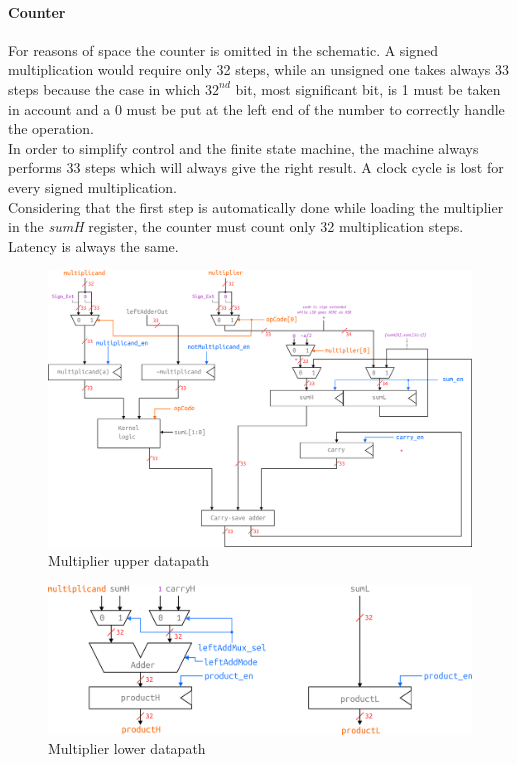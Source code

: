 \paragraph{Counter}
For reasons of space the counter is omitted in the schematic. A signed multiplication would require only 32 steps, while an unsigned one takes always 33 steps because the case in which $32^{nd}$ bit, most significant bit, is 1 must be taken in account and a 0 must be put at the left end of the number to correctly handle the operation.\\
In order to simplify control and the finite state machine, the machine always performs 33 steps which will always give the right result. A clock cycle is lost for every signed multiplication.\\
Considering that the first step is automatically done while loading the multiplier in the \textit{sumH} register, the counter must count only 32 multiplication steps. Latency is always the same.\\
\begin{figure}[H]
    \centering
    \includegraphics[angle=90,scale=1]{pics/multiplierKernelCircuit.png}
    \caption{Multiplier upper datapath}
    \label{fig:my_label}
\end{figure}
\begin{figure}[H]
\includegraphics[scale=1]{pics/multiplierOutReg.png}
    \caption{Multiplier lower datapath}
    \label{fig:my_label}
\end{figure}
